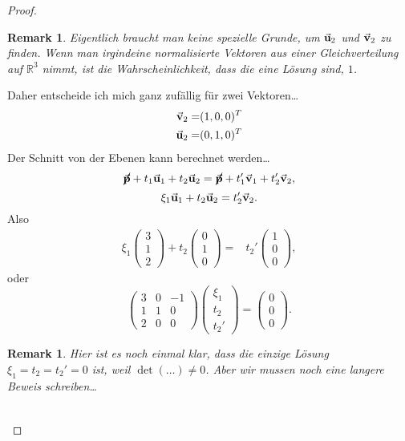 \documentclass[prb,12pt]{revtex4-2}
\newtheorem{Remark}[Theorem]{Remark}
\theoremstyle{definition}
\theoremstyle{definition}
\newenvironment{parts}{\begin{enumerate}[label=(\alph*)]}{\end{enumerate}}
\newcommand{\R}{\mathbb{R}}
\begin{document}
\begin{proof}
\begin{parts}
		\begin{Remark}
			Eigentlich braucht man keine spezielle Grunde, um $\va u_2$ und $\va v_2$ zu finden. Wenn man irgindeine normalisierte Vektoren aus einer Gleichverteilung auf $\R^3$ nimmt, ist die Wahrscheinlichkeit, dass die eine L\"{o}sung sind, $1$.
		\end{Remark}
		Daher entscheide ich mich ganz zufällig f\"{u}r zwei Vektoren\ldots
		\begin{align*}
			\va v_2=&(1,0,0)^T\\
			\va u_2=&(0,1,0)^T
		\end{align*}
			Der Schnitt von der Ebenen kann berechnet werden\ldots
		\[
			\cancel{\va p}+t_1\va u_1+t_2\va u_2=\cancel{\va p}+t_1'\va v_1+t_2'\va v_2
		,\]
		\[
		\xi_1\va u_1+t_2\va u_2=t_2'\va v_2
		.\] 
		Also
		\begin{align*}
			\xi_1 \begin{pmatrix} 3 \\ 1 \\ 2 \end{pmatrix} +t_2 \begin{pmatrix} 0 \\ 1 \\ 0 \end{pmatrix} =&t_2'\begin{pmatrix} 1 \\ 0 \\ 0 \end{pmatrix}, 
		\end{align*}
		oder
		\[
			\begin{pmatrix} 3 & 0 & -1 \\ 1 & 1 & 0 \\ 2 & 0 & 0 \end{pmatrix} \begin{pmatrix} \xi_1\\ t_2\\ t_2' \end{pmatrix} =\begin{pmatrix} 0 \\ 0 \\ 0 \end{pmatrix} 
		.\]
		\begin{Remark}
			Hier ist es noch einmal klar, dass die einzige Lösung $\xi_1=t_2=t_2'=0$ ist, weil $\det(\dots)\neq 0$. Aber wir mussen noch eine langere Beweis schreiben\ldots
		\end{Remark}
\begin{gather*}

\end{gather*}
\end{parts}
\end{proof}
\end{document}
